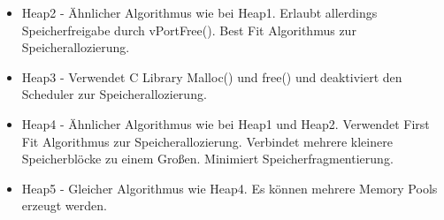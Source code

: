 \begin{itemize}
	\item Heap2 - Ähnlicher Algorithmus wie bei Heap1. Erlaubt allerdings Speicherfreigabe durch vPortFree(). Best Fit Algorithmus zur Speicherallozierung. 
	\item Heap3 - Verwendet C Library Malloc() und free() und deaktiviert den Scheduler zur Speicherallozierung.
	\item Heap4 - Ähnlicher Algorithmus wie bei Heap1 und Heap2. Verwendet First Fit Algorithmus zur Speicherallozierung. Verbindet mehrere kleinere Speicherblöcke zu einem Großen. Minimiert Speicherfragmentierung.
	\item Heap5 - Gleicher Algorithmus wie Heap4. Es kön\-nen mehrere Memory Pools erzeugt werden.
\end{itemize}
